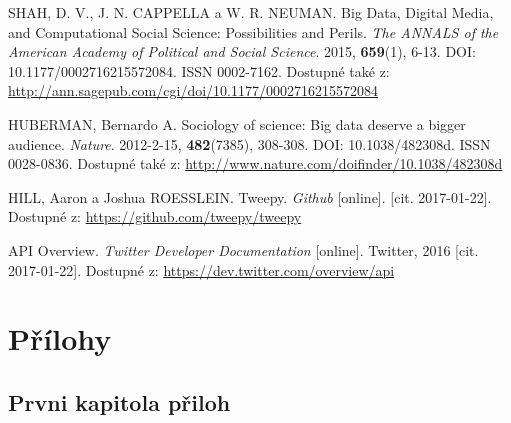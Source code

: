 \documentclass[12pt, a4paper]{article}
\numberwithin{equation}{section} 	%
\begin{document}
\begin{thebibliography}{99}
    SHAH, D. V., J. N. CAPPELLA a W. R. NEUMAN. Big Data, Digital Media, and Computational Social Science: Possibilities and Perils. \textit{The ANNALS of the American Academy of Political and Social Science}. 2015, \textbf{659}(1), 6-13. DOI: 10.1177/0002716215572084. ISSN 0002-7162. Dostupné také z: \url{http://ann.sagepub.com/cgi/doi/10.1177/0002716215572084}

    HUBERMAN, Bernardo A. Sociology of science: Big data deserve a bigger audience. \textit{Nature}. 2012-2-15, \textbf{482}(7385), 308-308. DOI: 10.1038/482308d. ISSN 0028-0836. Dostupné také z: \url{http://www.nature.com/doifinder/10.1038/482308d}

    HILL, Aaron a Joshua ROESSLEIN. Tweepy. \textit{Github} [online]. [cit. 2017-01-22]. Dostupné z: \url{https://github.com/tweepy/tweepy}

    API Overview. \textit{Twitter Developer Documentation} [online]. Twitter, 2016 [cit. 2017-01-22]. Dostupné z: \url{https://dev.twitter.com/overview/api}
\end{thebibliography}

\newpage
\section*{Přílohy}
\subsection*{Prvni kapitola přiloh}
\noindent
\end{document}
